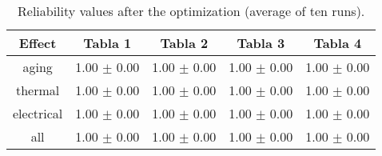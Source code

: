 \begin{table}
  \centering
  
  \caption{Reliability values after the optimization (average of ten runs).}
  \label{tab:rel_optimization}
\begin{tabular}{c c c c c }
\hline
Effect & Tabla 1 & Tabla 2 & Tabla 3 & Tabla 4 \\
\hline
aging & 1.00 $\pm$ 0.00 & 1.00 $\pm$ 0.00 & 1.00 $\pm$ 0.00 & 1.00 $\pm$ 0.00 \\
thermal & 1.00 $\pm$ 0.00 & 1.00 $\pm$ 0.00 & 1.00 $\pm$ 0.00 & 1.00 $\pm$ 0.00 \\
electrical & 1.00 $\pm$ 0.00 & 1.00 $\pm$ 0.00 & 1.00 $\pm$ 0.00 & 1.00 $\pm$ 0.00 \\
all & 1.00 $\pm$ 0.00 & 1.00 $\pm$ 0.00 & 1.00 $\pm$ 0.00 & 1.00 $\pm$ 0.00 \\
\hline
\end{tabular}
\end{table}